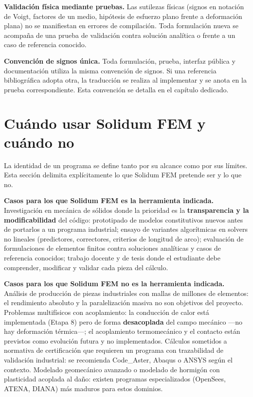 \documentclass[11pt,oneside]{report}
\begin{document}
\textbf{Validación física mediante pruebas.} Las sutilezas físicas (signos en notación de Voigt, factores de un medio, hipótesis de esfuerzo plano frente a deformación plana) no se manifiestan en errores de compilación. Toda formulación nueva se acompaña de una prueba de validación contra solución analítica o frente a un caso de referencia conocido.

\textbf{Convención de signos única.} Toda formulación, prueba, interfaz pública y documentación utiliza la misma convención de signos. Si una referencia bibliográfica adopta otra, la traducción se realiza al implementar y se anota en la prueba correspondiente. Esta convención se detalla en el capítulo dedicado.

\section{Cuándo usar Solidum FEM y cuándo no}

La identidad de un programa se define tanto por su alcance como por sus límites. Esta sección delimita explícitamente lo que Solidum FEM pretende ser y lo que no.

\textbf{Casos para los que Solidum FEM es la herramienta indicada.} Investigación en mecánica de sólidos donde la prioridad es la \textbf{transparencia y la modificabilidad} del código: prototipado de modelos constitutivos nuevos antes de portarlos a un programa industrial; ensayo de variantes algorítmicas en solvers no lineales (predictores, correctores, criterios de longitud de arco); evaluación de formulaciones de elementos finitos contra soluciones analíticas y casos de referencia conocidos; trabajo docente y de tesis donde el estudiante debe comprender, modificar y validar cada pieza del cálculo.

\textbf{Casos para los que Solidum FEM no es la herramienta indicada.} Análisis de producción de piezas industriales con mallas de millones de elementos: el rendimiento absoluto y la paralelización masiva no son objetivos del proyecto. Problemas multifísicos con acoplamiento: la conducción de calor está implementada (Etapa 8) pero de forma \textbf{desacoplada} del campo mecánico ---no hay deformación térmica---; el acoplamiento termomecánico y el contacto están previstos como evolución futura y no implementados. Cálculos sometidos a normativa de certificación que requieren un programa con trazabilidad de validación industrial: se recomienda Code\_Aster, Abaqus o ANSYS según el contexto. Modelado geomecánico avanzado o modelado de hormigón con plasticidad acoplada al daño: existen programas especializados (OpenSees, ATENA, DIANA) más maduros para estos dominios.
\end{document}
